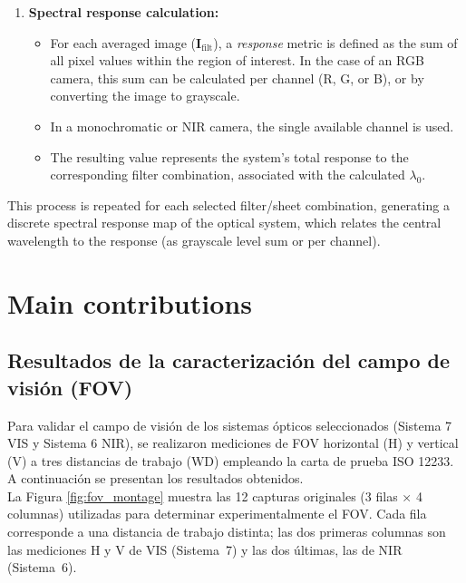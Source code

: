 \begin{enumerate}
    \item \textbf{Spectral response calculation:}
    \begin{itemize}
        \item For each averaged image (\(\mathbf{I}_{\text{filt}}\)), a \emph{response} metric is defined as the sum of all pixel values within the region of interest. In the case of an RGB camera, this sum can be calculated per channel (R, G, or B), or by converting the image to grayscale.
        \item In a monochromatic or NIR camera, the single available channel is used.
        \item The resulting value represents the system’s total response to the corresponding filter combination, associated with the calculated \(\lambda_0\).
    \end{itemize}
\end{enumerate}

\noindent
This process is repeated for each selected filter/sheet combination, generating a discrete spectral response map of the optical system, which relates the central wavelength to the response (as grayscale level sum or per channel).


\section{Main contributions}
     \subsection{Resultados de la caracterización del campo de visión (FOV)}
     \label{sec:fov_resultados}
     
     Para validar el campo de visión de los sistemas ópticos seleccionados (Sistema 7 VIS y Sistema 6 NIR), se realizaron mediciones de FOV horizontal (H) y vertical (V) a tres distancias de trabajo (\(\mathrm{WD}\)) empleando la carta de prueba ISO 12233. A continuación se presentan los resultados obtenidos.\\
     
     La Figura \ref{fig:fov_montage} muestra las 12 capturas originales (3 filas × 4 columnas) utilizadas para determinar experimentalmente el FOV. Cada fila corresponde a una distancia de trabajo distinta; las dos primeras columnas son las mediciones H y V de VIS (Sistema 7) y las dos últimas, las de NIR (Sistema 6).
     
